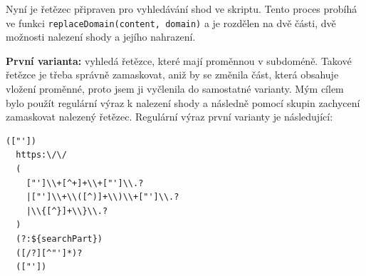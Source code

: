 Nyní je řetězec připraven pro vyhledávání shod ve skriptu. Tento proces probíhá ve funkci \texttt{replaceDomain(content, domain)} a je rozdělen na dvě části, dvě možnosti nalezení shody a jejího nahrazení.

\textbf{První varianta:} vyhledá řetězce, které mají proměnnou v subdoméně. Takové řetězce je třeba správně zamaskovat, aniž by se změnila část, která obsahuje vložení proměnné, proto jsem ji vyčlenila do samostatné varianty. Mým cílem bylo použít regulární výraz k nalezení shody a následně pomocí skupin zachycení zamaskovat nalezený řetězec. Regulární výraz první varianty je následující:

\begin{lstlisting}[caption=Regulární výraz]
  (["'])                            
  https:\/\/                        
  (
    ["']\\+[^+]+\\+["']\\.?           
    |["']\\+\\([^)]+\\)\\+["']\\.?      
    |\\{[^}]+\\}\\.?                   
  )
  (?:${searchPart})             
  ([/?][^"']*)?                    
  (["']) 
\end{lstlisting}

